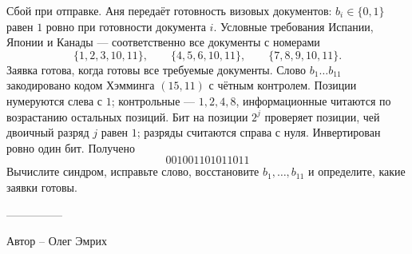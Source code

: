 \question
Сбой при отправке. Аня передаёт готовность визовых документов: $b_i\in\{0,1\}$ равен $1$ ровно при готовности документа $i$. Условные требования Испании, Японии и Канады --- соответственно все документы с номерами
\[
\{1,2,3,10,11\},\qquad \{4,5,6,10,11\},\qquad \{7,8,9,10,11\}.
\]
Заявка готова, когда готовы все требуемые документы. Слово $b_1\ldots b_{11}$ закодировано кодом Хэмминга $(15,11)$ с чётным контролем. Позиции нумеруются слева с $1$; контрольные --- $1,2,4,8$, информационные читаются по возрастанию остальных позиций. Бит на позиции $2^j$ проверяет позиции, чей двоичный разряд $j$ равен $1$; разряды считаются справа с нуля. Инвертирован ровно один бит. Получено
\[
001001101011011
\]
Вычислите синдром, исправьте слово, восстановите $b_1,\ldots,b_{11}$ и определите, какие заявки готовы.

---------------

Автор -- Олег Эмрих
